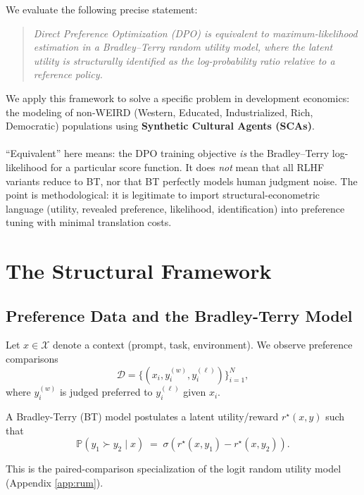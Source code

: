 \documentclass[11pt]{article}
\theoremstyle{plain}
\theoremstyle{definition}
\theoremstyle{remark}
\newcommand{\1}{\mathbf{1}}
\newcommand{\sigmoid}{\sigma}
\begin{document}
We evaluate the following precise statement:
\begin{quote}
\emph{Direct Preference Optimization (DPO) is equivalent to maximum-likelihood estimation in a Bradley--Terry random utility model, where the latent utility is structurally identified as the log-probability ratio relative to a reference policy.}
\end{quote}

We apply this framework to solve a specific problem in development economics: the modeling of non-WEIRD (Western, Educated, Industrialized, Rich, Democratic) populations using \textbf{Synthetic Cultural Agents (SCAs)}.
\\
\\
\noindent ``Equivalent'' here means: the DPO training objective \emph{is} the Bradley--Terry log-likelihood for a particular score function.
It does \emph{not} mean that all RLHF variants reduce to BT, nor that BT perfectly models human judgment noise.
The point is methodological: it is legitimate to import structural-econometric language (utility, revealed preference, likelihood, identification) into preference tuning with minimal translation costs.

\section{The Structural Framework}\label{sec:theory}

\subsection{Preference Data and the Bradley-Terry Model}
Let $x\in\mathcal{X}$ denote a context (prompt, task, environment). We observe preference comparisons
\[
\mathcal{D}=\{(x_i, y^{(w)}_i, y^{(\ell)}_i)\}_{i=1}^N,
\]
where $y^{(w)}_i$ is judged preferred to $y^{(\ell)}_i$ given $x_i$.

A Bradley-Terry (BT) model postulates a latent utility/reward $r^\star(x,y)$ such that
\begin{equation}\label{eq:BT}
\mathbb{P}\!\left(y_1 \succ y_2 \mid x\right) \;=\; \sigmoid\!\left(r^\star(x,y_1)-r^\star(x,y_2)\right).
\end{equation}

This is the paired-comparison specialization of the logit random utility model (Appendix \ref{app:rum}).
\end{document}
